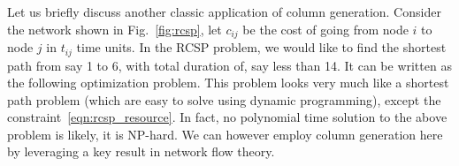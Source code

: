 \documentclass[letterpaper, 10pt, twocolumn, reqno]{amsart}
\begin{document}
Let us briefly discuss another classic application of column generation. Consider the network shown in Fig.~\ref{fig:rcsp}, let $c_{ij}$ be the cost of going from node $i$ to node $j$ in $t_{ij}$ time units. In the RCSP problem, we would like to find the shortest path from say 1 to 6, with total duration of, say less than 14. It can be written as the following optimization problem.
This problem looks very much like a shortest path problem (which are easy to solve using dynamic programming), except the constraint~\eqref{eqn:rcsp_resource}. In fact, no polynomial time solution to the above problem is likely, it is NP-hard. We can however employ column generation here by leveraging a key result in network flow theory.
\end{document}
